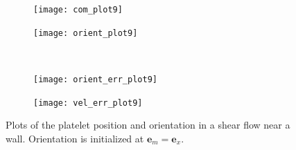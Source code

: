 \documentclass{article}
\newcommand{\vect}[1]{\boldsymbol{\mathbf{#1}}}
\begin{document}
\begin{figure}
  \centering
  \begin{subfigure}{0.49\textwidth}
    \texttt{[image: com\_plot9]}
  \end{subfigure}
  \hfill
  \begin{subfigure}{0.49\textwidth}
    \texttt{[image: orient\_plot9]}
  \end{subfigure}
  \\
  \begin{subfigure}{0.49\textwidth}
    \texttt{[image: orient\_err\_plot9]}
  \end{subfigure}
  \hfill
  \begin{subfigure}{0.49\textwidth}
    \texttt{[image: vel\_err\_plot9]}
  \end{subfigure}
  \caption{Plots of the platelet position and orientation in a shear
    flow near a wall. Orientation is initialized at $\vect{e}_m =
    \vect{e}_x$.} 
  \label{fig:com_plot9}
\end{figure}



\end{document}
